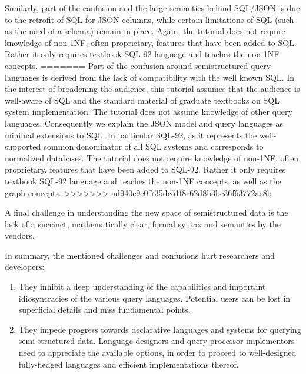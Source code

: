 Similarly, part of the confusion and the large semantics behind SQL/JSON is due to the retrofit of SQL for JSON columns, while certain limitations of SQL (such as the need of a schema) remain in place. Again, the tutorial does not require knowledge of non-1NF, often proprietary, features that have been added to SQL. Rather it only requires textbook SQL-92 language and teaches the non-1NF concepts.
=======
Part of the confusion around semistructured query languages is derived from the lack of compatibility with the well known SQL. In the interest of broadening the audience, this tutorial assumes that the audience is well-aware of SQL and the standard material of graduate textbooks on SQL system implementation. The tutorial does not assume knowledge of other query languages. Consequently we explain the JSON model and query languages as minimal extensions to SQL. In particular SQL-92, as it represents the well-supported common denominator of all SQL systems and corresponds to normalized databases. The tutorial does not require knowledge of non-1NF, often proprietary, features that have been added to SQL-92. Rather it only requires textbook SQL-92 language and teaches the non-1NF concepts, as well as the graph concepts.
>>>>>>> ad940c9e0f735dc51f8c62d8b3bc36f63772ac8b

A final challenge in understanding the new space of semistructured data is the lack of a succinct, mathematically clear, formal syntax and semantics by the vendors. 

In summary, the mentioned challenges and confusions hurt researchers and developers:

\begin{enumerate}
\item They inhibit a deep understanding of the capabilities and important idiosyncracies of the various query languages. Potential users can be lost in superficial details and miss fundamental points.
\item They impede progress towards declarative languages and systems for querying semi-structured data. Language designers and query processor implementors need to appreciate the available options, in order to proceed to well-designed fully-fledged languages and efficient implementations thereof. 
\end{enumerate}

